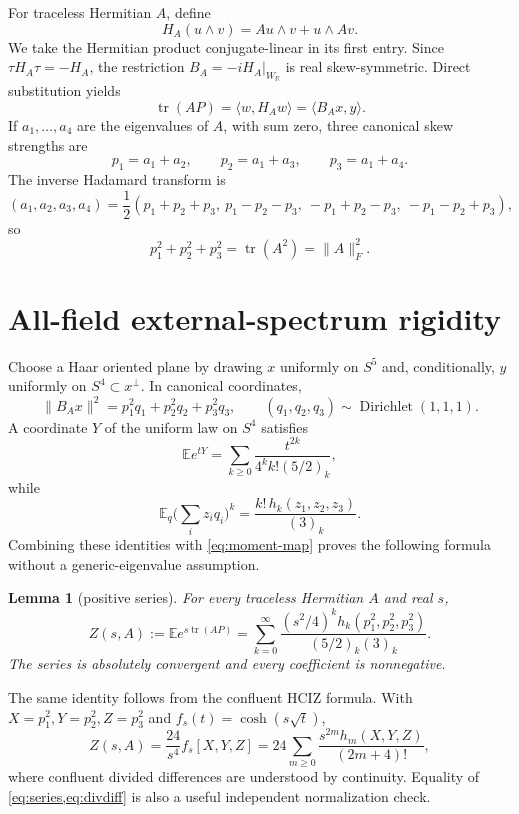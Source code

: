 \documentclass[11pt,a4paper]{article}
\newtheorem{lemma}[theorem]{Lemma}
\newcommand{\tr}{\operatorname{tr}}
\newcommand{\E}{\mathbb E}
\begin{document}
For traceless Hermitian $A$, define
\[
H_A(u\wedge v)=Au\wedge v+u\wedge Av.
\]
We take the Hermitian product conjugate-linear in its first entry.  Since $\tau H_A\tau=-H_A$, the restriction $B_A=-iH_A|_{W_{\mathbb R}}$ is real skew-symmetric.  Direct substitution yields
\begin{equation}\label{eq:moment-map}
\tr(AP)=\langle w,H_Aw\rangle=\langle B_Ax,y\rangle.
\end{equation}
If $a_1,\ldots,a_4$ are the eigenvalues of $A$, with sum zero, three canonical skew strengths are
\[
p_1=a_1+a_2,\qquad p_2=a_1+a_3,\qquad p_3=a_1+a_4.
\]
The inverse Hadamard transform is
\begin{equation}\label{eq:hadamard}
(a_1,a_2,a_3,a_4)=\frac12(p_1+p_2+p_3,\ p_1-p_2-p_3,\ -p_1+p_2-p_3,\ -p_1-p_2+p_3),
\end{equation}
so
\begin{equation}\label{eq:norm}
p_1^2+p_2^2+p_3^2=\tr(A^2)=\lVert A\rVert_F^2.
\end{equation}

\section{All-field external-spectrum rigidity}

Choose a Haar oriented plane by drawing $x$ uniformly on $S^5$ and, conditionally, $y$ uniformly on $S^4\subset x^\perp$.  In canonical coordinates,
\[
\lVert B_Ax\rVert^2=p_1^2q_1+p_2^2q_2+p_3^2q_3,
\qquad(q_1,q_2,q_3)\sim\operatorname{Dirichlet}(1,1,1).
\]
A coordinate $Y$ of the uniform law on $S^4$ satisfies
\[
\E e^{tY}=\sum_{k\ge0}\frac{t^{2k}}{4^k k!(5/2)_k},
\]
while
\[
\E_q\Big(\sum_i z_iq_i\Big)^k=\frac{k!\,h_k(z_1,z_2,z_3)}{(3)_k}.
\]
Combining these identities with \cref{eq:moment-map} proves the following formula without a generic-eigenvalue assumption.

\begin{lemma}[positive series]\label{lem:series}
For every traceless Hermitian $A$ and real $s$,
\begin{equation}\label{eq:series}
Z(s,A):=\E e^{s\tr(AP)}
=\sum_{k=0}^{\infty}\frac{(s^2/4)^k h_k(p_1^2,p_2^2,p_3^2)}{(5/2)_k(3)_k}.
\end{equation}
The series is absolutely convergent and every coefficient is nonnegative.
\end{lemma}

The same identity follows from the confluent HCIZ formula.  With $X=p_1^2,Y=p_2^2,Z=p_3^2$ and $f_s(t)=\cosh(s\sqrt t)$,
\begin{equation}\label{eq:divdiff}
Z(s,A)=\frac{24}{s^4}f_s[X,Y,Z]
=24\sum_{m\ge0}\frac{s^{2m}h_m(X,Y,Z)}{(2m+4)!},
\end{equation}
where confluent divided differences are understood by continuity.  Equality of \cref{eq:series,eq:divdiff} is also a useful independent normalization check.
\end{document}
